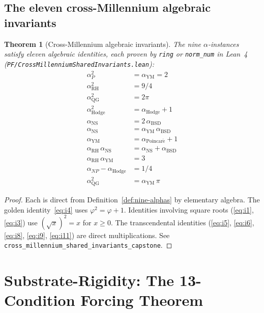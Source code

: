 \documentclass[11pt,a4paper,reqno]{amsart}
\theoremstyle{plain}
\newtheorem{theorem}{Theorem}[section]
\theoremstyle{definition}
\theoremstyle{remark}
\newcommand{\aPo}{\alpha_{\mathrm{Poincar\acute{e}}}}
\newcommand{\aP}{\alpha_{P}}
\newcommand{\aNP}{\alpha_{NP}}
\newcommand{\aRH}{\alpha_{\mathrm{RH}}}
\newcommand{\aYM}{\alpha_{\mathrm{YM}}}
\newcommand{\aNS}{\alpha_{\mathrm{NS}}}
\newcommand{\aBSD}{\alpha_{\mathrm{BSD}}}
\newcommand{\aHodge}{\alpha_{\mathrm{Hodge}}}
\newcommand{\aQG}{\alpha_{\mathrm{QG}}}
\newcommand{\code}[1]{\texttt{#1}}
\begin{document}
\subsection{The eleven cross-Millennium algebraic invariants}
\label{subsec:eleven-invariants}

\begin{theorem}[Cross-Millennium algebraic invariants]
\label{thm:eleven-invariants}
The nine $\alpha$-instances satisfy eleven algebraic identities, each
proven by \code{ring} or \code{norm\_num} in Lean~4
\textup{(\code{PF/CrossMillenniumSharedInvariants.lean})}:
\begin{align}
\aP^{2}             &= \aYM = 2 \label{eq:i1}\\
\aRH^{2}            &= 9/4 \label{eq:i2}\\
\aQG^{2}            &= 2\pi \label{eq:i3}\\
\aHodge^{2}         &= \aHodge + 1 \label{eq:i4}\\
\aNS                &= 2 \, \aBSD \label{eq:i5}\\
\aNS                &= \aYM \, \aBSD \label{eq:i6}\\
\aYM                &= \aPo + 1 \label{eq:i7}\\
\aRH \, \aNS        &= \aNS + \aBSD \label{eq:i8}\\
\aRH \, \aYM        &= 3 \label{eq:i9}\\
\aNP - \aHodge      &= 1/4 \label{eq:i10}\\
\aQG^{2}            &= \aYM \, \pi \label{eq:i11}
\end{align}
\end{theorem}

\begin{proof}
Each is direct from Definition~\ref{def:nine-alphas} by elementary
algebra. The golden identity~\eqref{eq:i4} uses
$\varphi^{2} = \varphi + 1$. Identities involving square roots
(\eqref{eq:i1}, \eqref{eq:i3}) use $(\sqrt{x})^{2} = x$ for $x \ge 0$.
The transcendental identities (\eqref{eq:i5}, \eqref{eq:i6},
\eqref{eq:i8}, \eqref{eq:i9}, \eqref{eq:i11}) are direct
multiplications. See \code{cross\_millennium\_shared\_invariants\_capstone}.
\end{proof}

\section{Substrate-Rigidity: The 13-Condition Forcing Theorem}
\label{sec:substrate-rigidity}
\end{document}
